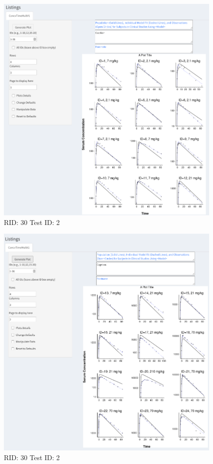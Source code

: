 \begin{figure}[H]
\includegraphics[width=.8\textwidth]{screencaps/30-2-1.png}
\caption{RID: 30 Test ID: 2}
\end{figure}
\begin{figure}[H]
\includegraphics[width=.8\textwidth]{screencaps/30-2-2.png}
\caption{RID: 30 Test ID: 2}
\end{figure}
